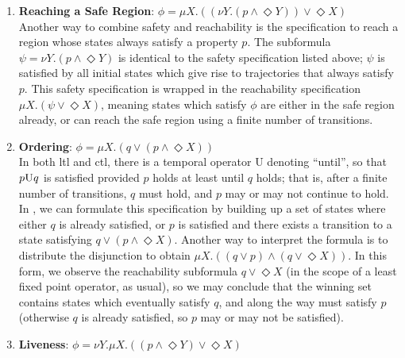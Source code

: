 \begin{enumerate}[label = (\roman*)]
    \item \textbf{Reaching a Safe Region}: $\phi = \mu X.((\nu Y.(p \land \Diamond Y)) \lor \Diamond X)$\\
    Another way to combine safety and reachability is the specification to reach a region whose states always satisfy a property $p$. The subformula ${\psi = \nu Y.(p \land \Diamond Y)}$ is identical to the safety specification listed above; $\psi$ is satisfied by all initial states which give rise to trajectories that always satisfy $p$. This safety specification is wrapped in the reachability specification ${\mu X.(\psi \lor \Diamond X)}$, meaning states which satisfy $\phi$ are either in the safe region already, or can reach the safe region using a finite number of transitions.

    \item \textbf{Ordering}: $\phi = \mu X.(q \lor (p \land \Diamond X))$\\
    In both \gls{ltl} and \gls{ctl}, there is a temporal operator \textsc{U} denoting ``until'', so that $p \textsc{U} q$ is satisfied provided $p$ holds at least until $q$ holds; that is, after a finite number of transitions, $q$ must hold, and $p$ may or may not continue to hold. In \mucalc{}, we can formulate this specification by building up a set of states where either $q$ is already satisfied, or $p$ is satisfied and there exists a transition to a state satisfying ${q \lor (p \land \Diamond X)}$. Another way to interpret the formula is to distribute the disjunction to obtain ${\mu X.((q \lor p) \land (q \lor \Diamond X))}$. In this form, we observe the reachability subformula ${q \lor \Diamond X}$ (in the scope of a least fixed point operator, as usual), so we may conclude that the winning set contains states which eventually satisfy $q$, and along the way must satisfy $p$ (otherwise $q$ is already satisfied, so $p$ may or may not be satisfied).

    \item \textbf{Liveness}: $\phi = \nu Y. \mu X.((p \land \Diamond Y) \lor \Diamond X)$


\end{enumerate}

